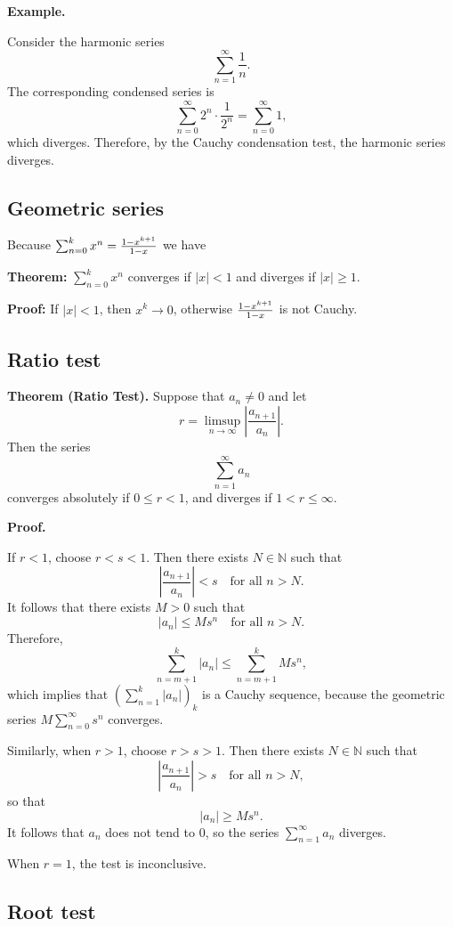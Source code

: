 \documentclass{article}
\begin{document}
\textbf{Example.}

Consider the harmonic series
\[
\sum_{n=1}^{\infty} \frac{1}{n}.
\]
The corresponding condensed series is
\[
\sum_{n=0}^{\infty} 2^n \cdot \frac{1}{2^n} = \sum_{n=0}^{\infty} 1,
\]
which diverges. Therefore, by the Cauchy condensation test, the harmonic series diverges.

\subsection{Geometric series}

Because $\sum_{n=0}^{k}{x^n}={1-x^{k+1}\over 1-x}$ we have

\textbf{Theorem:} $\sum_{n=0}^{k}{x^n}$ converges if $|x|<1$ and diverges if $|x|\geq 1$.

\textbf{Proof:} If $|x|<1$, then $x^k\to 0$, otherwise ${1-x^{k+1}\over 1-x}$ is not Cauchy.

\subsection{Ratio test}


\textbf{Theorem (Ratio Test).}
Suppose that \( a_n \neq 0 \) and let
\[
r = \limsup_{n \to \infty} \left| \frac{a_{n+1}}{a_n} \right|.
\]
Then the series
\[
\sum_{n=1}^{\infty} a_n
\]
converges absolutely if \( 0 \le r < 1 \), and diverges if \( 1 < r \le \infty \).

\textbf{Proof.}

If \( r < 1 \), choose \( r < s < 1 \).  
Then there exists \( N \in \mathbb{N} \) such that
\[
\left| \frac{a_{n+1}}{a_n} \right| < s \quad \text{for all } n > N.
\]
It follows that there exists \( M > 0 \) such that
\[
|a_n| \le M s^n \quad \text{for all } n > N.
\]
Therefore,
\[
\sum_{n=m+1}^{k} |a_n| \le \sum_{n=m+1}^{k} M s^n,
\]
which implies that \( \left( \sum_{n=1}^{k} |a_n| \right)_k \) is a Cauchy sequence,  
because the geometric series \( M \sum_{n=0}^{\infty} s^n \) converges.

Similarly, when \( r > 1 \), choose \( r > s > 1 \).  
Then there exists \( N \in \mathbb{N} \) such that
\[
\left| \frac{a_{n+1}}{a_n} \right| > s \quad \text{for all } n > N,
\]
so that
\[
|a_n| \ge M s^n.
\]
It follows that \( a_n \) does not tend to 0,  
so the series \( \sum_{n=1}^{\infty} a_n \) diverges.

When \( r = 1 \), the test is inconclusive.


\subsection{Root test}
\end{document}
